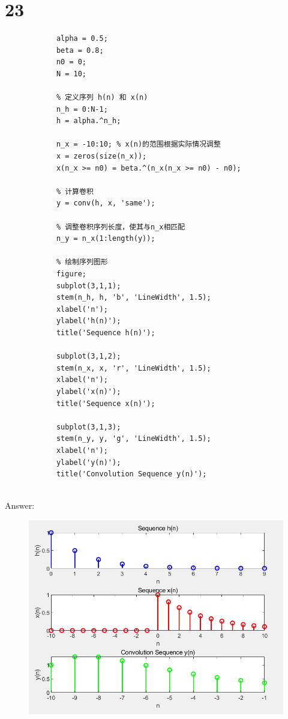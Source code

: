 \documentclass{article}
\begin{document}
    \section*{23}
        \begin{lstlisting}[caption={题23 MATLAB代码}, label={lst:matlab}]
            % 定义序列参数
            alpha = 0.5;
            beta = 0.8;
            n0 = 0;
            N = 10;

            % 定义序列 h(n) 和 x(n)
            n_h = 0:N-1;
            h = alpha.^n_h;

            n_x = -10:10; % x(n)的范围根据实际情况调整
            x = zeros(size(n_x));
            x(n_x >= n0) = beta.^(n_x(n_x >= n0) - n0);

            % 计算卷积
            y = conv(h, x, 'same');

            % 调整卷积序列长度，使其与n_x相匹配
            n_y = n_x(1:length(y));

            % 绘制序列图形
            figure;
            subplot(3,1,1);
            stem(n_h, h, 'b', 'LineWidth', 1.5);
            xlabel('n');
            ylabel('h(n)');
            title('Sequence h(n)');

            subplot(3,1,2);
            stem(n_x, x, 'r', 'LineWidth', 1.5);
            xlabel('n');
            ylabel('x(n)');
            title('Sequence x(n)');

            subplot(3,1,3);
            stem(n_y, y, 'g', 'LineWidth', 1.5);
            xlabel('n');
            ylabel('y(n)');
            title('Convolution Sequence y(n)');


        \end{lstlisting}
        Answer: 
            \begin{figure}[h]
                \includegraphics[scale=0.75]{23.png}
            \end{figure}
            \FloatBarrier
\end{document}
